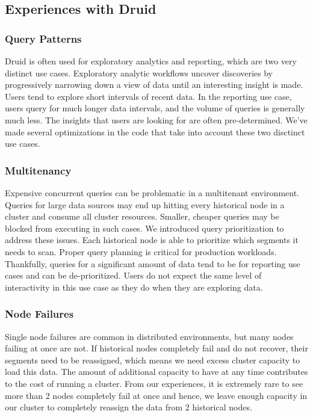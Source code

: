 \documentclass{vldb}
\begin{document}
{\subsection{Experiences with Druid}
\subsubsection{Query Patterns}
Druid is often used for exploratory analytics and reporting, which are two very
distinct use cases. Exploratory analytic workflows uncover discoveries by
progressively narrowing down a view of data until an interesting insight is
made. Users tend to explore short intervals of recent data. In the reporting
use case, users query for much longer data intervals, and the volume of queries
is generally much less. The insights that users are looking for are often
pre-determined. We've made several optimizations in the code that take into
account these two disctinct use cases.

\subsubsection{Multitenancy}
Expensive concurrent queries can be problematic in a multitenant environment.
Queries for large data sources may end up hitting every historical node in a
cluster and consume all cluster resources. Smaller, cheaper queries may be
blocked from executing in such cases. We introduced query prioritization to
address these issues. Each historical node is able to prioritize which segments
it needs to scan. Proper query planning is critical for production workloads.
Thankfully, queries for a significant amount of data tend to be for reporting
use cases and can be de-prioritized. Users do not expect the same level of
interactivity in this use case as they do when they are exploring data. 

\subsubsection{Node Failures}
Single node failures are common in distributed environments, but many nodes
failing at once are not. If historical nodes completely fail and do not
recover, their segments need to be reassigned, which means we need excess
cluster capacity to load this data. The amount of additional capacity to have
at any time contributes to the cost of running a cluster. From our experiences,
it is extremely rare to see more than 2 nodes completely fail at once and
hence, we leave enough capacity in our cluster to completely reassign the data
from 2 historical nodes. 

}
\end{document}

